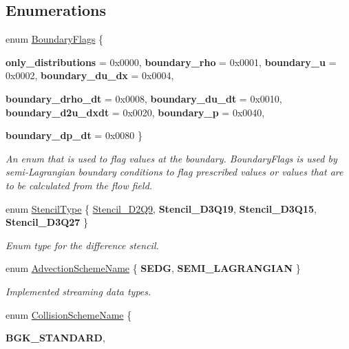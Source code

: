 \subsection*{Enumerations}
\begin{DoxyCompactItemize}
\item 
enum \hyperlink{namespacenatrium_a93b2a3d564675413b9f6cc88c60f46af}{BoundaryFlags} \{ \par
{\bfseries only\_\-distributions} =  0x0000, 
{\bfseries boundary\_\-rho} =  0x0001, 
{\bfseries boundary\_\-u} =  0x0002, 
{\bfseries boundary\_\-du\_\-dx} =  0x0004, 
\par
{\bfseries boundary\_\-drho\_\-dt} =  0x0008, 
{\bfseries boundary\_\-du\_\-dt} =  0x0010, 
{\bfseries boundary\_\-d2u\_\-dxdt} =  0x0020, 
{\bfseries boundary\_\-p} =  0x0040, 
\par
{\bfseries boundary\_\-dp\_\-dt} =  0x0080
 \}
\begin{DoxyCompactList}\small\item\em An enum that is used to flag values at the boundary. BoundaryFlags is used by semi-\/Lagrangian boundary conditions to flag prescribed values or values that are to be calculated from the flow field. \item\end{DoxyCompactList}\item 
enum \hyperlink{namespacenatrium_a45d5dacaf5eb5efde670179d949173ba}{StencilType} \{ \hyperlink{namespacenatrium_a45d5dacaf5eb5efde670179d949173baabe9c0ce3734a5131262789758ca5fbd1}{Stencil\_\-D2Q9}, 
{\bfseries Stencil\_\-D3Q19}, 
{\bfseries Stencil\_\-D3Q15}, 
{\bfseries Stencil\_\-D3Q27}
 \}
\begin{DoxyCompactList}\small\item\em Enum type for the difference stencil. \item\end{DoxyCompactList}\item 
enum \hyperlink{namespacenatrium_ab73faf50bccace063cee6f66b5af2b02}{AdvectionSchemeName} \{ {\bfseries SEDG}, 
{\bfseries SEMI\_\-LAGRANGIAN}
 \}
\begin{DoxyCompactList}\small\item\em Implemented streaming data types. \item\end{DoxyCompactList}\item 
enum \hyperlink{namespacenatrium_a77a27ea835db291372b246db6b4b1578}{CollisionSchemeName} \{ \par
{\bfseries BGK\_\-STANDARD}, 

\end{DoxyCompactItemize}
